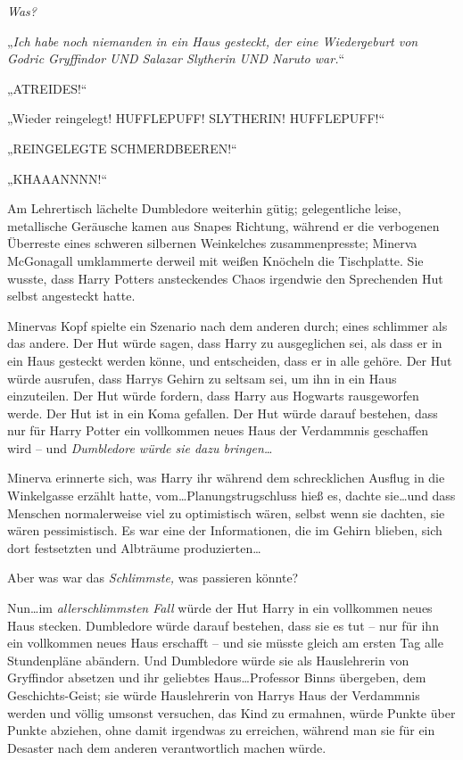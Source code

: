 \emph{Was?}

„\emph{Ich habe noch niemanden in ein Haus gesteckt, der eine Wiedergeburt von Godric Gryffindor UND Salazar Slytherin UND Naruto war.}“

\later

„ATREIDES!“

\later

„Wieder reingelegt! HUFFLEPUFF! SLYTHERIN! HUFFLEPUFF!“

\later

„REINGELEGTE SCHMERDBEEREN!“

\later

„KHAAANNNN!“

\later

Am Lehrertisch lächelte Dumbledore weiterhin gütig; gelegentliche leise, metallische Geräusche kamen aus Snapes Richtung, während er die verbogenen Überreste eines schweren silbernen Weinkelches zusammenpresste; Minerva McGonagall umklammerte derweil mit weißen Knöcheln die Tischplatte. Sie wusste, dass Harry Potters ansteckendes Chaos irgendwie den Sprechenden Hut selbst angesteckt hatte.

Minervas Kopf spielte ein Szenario nach dem anderen durch; eines schlimmer als das andere. Der Hut würde sagen, dass Harry zu ausgeglichen sei, als dass er in ein Haus gesteckt werden könne, und entscheiden, dass er in alle gehöre. Der Hut würde ausrufen, dass Harrys Gehirn zu seltsam sei, um ihn in ein Haus einzuteilen. Der Hut würde fordern, dass Harry aus Hogwarts rausgeworfen werde. Der Hut ist in ein Koma gefallen. Der Hut würde darauf bestehen, dass nur für Harry Potter ein vollkommen neues Haus der Verdammnis geschaffen wird – und \emph{Dumbledore würde sie dazu bringen…}

Minerva erinnerte sich, was Harry ihr während dem schrecklichen Ausflug in die Winkelgasse erzählt hatte, vom…Planungstrugschluss hieß es, dachte sie…und dass Menschen normalerweise viel zu optimistisch wären, selbst wenn sie dachten, sie wären pessimistisch. Es war eine der Informationen, die im Gehirn blieben, sich dort festsetzten und Albträume produzierten…

Aber was war das \emph{Schlimmste,} was passieren könnte?

Nun…im \emph{allerschlimmsten Fall} würde der Hut Harry in ein vollkommen neues Haus stecken. Dumbledore würde darauf bestehen, dass sie es tut – nur für ihn ein vollkommen neues Haus erschafft – und sie müsste gleich am ersten Tag alle Stundenpläne abändern. Und Dumbledore würde sie als Hauslehrerin von Gryffindor absetzen und ihr geliebtes Haus…Professor Binns übergeben, dem Geschichts-Geist; sie würde Hauslehrerin von Harrys Haus der Verdammnis werden und völlig umsonst versuchen, das Kind zu ermahnen, würde Punkte über Punkte abziehen, ohne damit irgendwas zu erreichen, während man sie für ein Desaster nach dem anderen verantwortlich machen würde.

